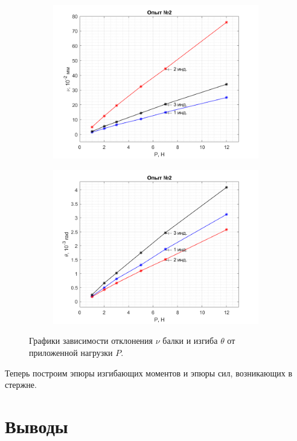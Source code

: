 \documentclass[12pt, a4paper]{article}
\begin{document}
    \begin{figure}[h!]
        \centering
        \hspace{-2cm}
        \begin{subfigure}{0.4\textwidth}
            \centering
            \includegraphics[width = 9cm]{figure_3.png}
        \end{subfigure}
        \hspace{1cm}
        \begin{subfigure}{0.4\textwidth}
            \centering
            \includegraphics[width = 9cm]{figure_4.png}
        \end{subfigure}
        \caption{\centering Графики зависимости отклонения $\nu$ балки и изгиба $\theta$ от приложенной нагрузки $P$.}
        \label{fig2}
    \end{figure}
    
    Теперь построим эпюры изгибающих моментов и эпюры сил, возникающих в стержне.
    
    \newpage
    
    \section{Выводы}
    
    
\end{document}
